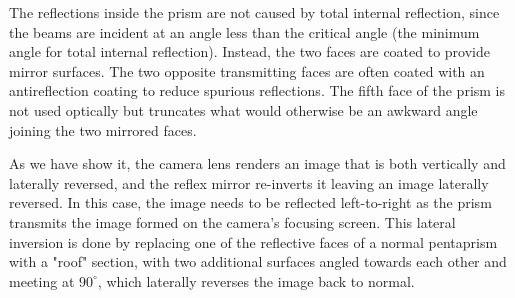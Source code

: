 	
	The reflections inside the prism are not caused by total internal reflection, since the beams are incident at an angle less than the critical angle (the minimum angle for total internal reflection). Instead, the two faces are coated to provide mirror surfaces. The two opposite transmitting faces are often coated with an antireflection coating to reduce spurious reflections. The fifth face of the prism is not used optically but truncates what would otherwise be an awkward angle joining the two mirrored faces.
	
	As we have show it, the camera lens renders an image that is both vertically and laterally reversed, and the reflex mirror re-inverts it leaving an image laterally reversed. In this case, the image needs to be reflected left-to-right as the prism transmits the image formed on the camera's focusing screen. This lateral inversion is done by replacing one of the reflective faces of a normal pentaprism with a "roof" section, with two additional surfaces angled towards each other and meeting at $90^\circ$, which laterally reverses the image back to normal. 
	

